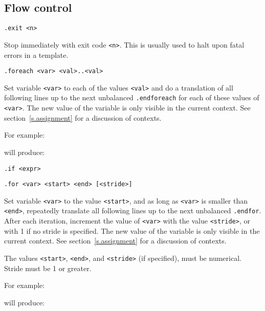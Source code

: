 \subsection{Flow control}
\begin{verbatim}
.exit <n>
\end{verbatim}
\begin{desc}
Stop {\Tm} immediately with exit code \texttt{<n>}.
This is usually used to halt upon fatal errors in a template.
\end{desc}
\begin{verbatim}
.foreach <var> <val>..<val>
\end{verbatim}
\begin{desc}
Set variable \texttt{<var>} to each of the values \texttt{<val>} and do a
translation of all following lines up to the next unbalanced
\texttt{.endforeach} for each of these values of \texttt{<var>}.
The new value of the variable is only visible in the current context.
See section~\ref{s.assignment} for a discussion of contexts.

For example:
\begin{showfile}

\end{showfile}
will produce:
\begin{showfile}

\end{showfile}
\end{desc}
\begin{verbatim}
.if <expr>
\end{verbatim}
\begin{verbatim}
.for <var> <start> <end> [<stride>]
\end{verbatim}
\begin{desc}
Set variable \texttt{<var>} to the value \texttt{<start>},
and as long as \texttt{<var>} is smaller than \texttt{<end>},
repeatedly translate all
following lines up to the next unbalanced
\texttt{.endfor}.
After each iteration, increment the value of
\texttt{<var>} with the value 
\texttt{<stride>}, or with 1 if no stride is specified.
The new value of the variable is only visible in the current context.
See section~\ref{s.assignment} for a discussion of contexts.

The values 
\texttt{<start>},
\texttt{<end>},
and \texttt{<stride>} (if specified), must be numerical.
Stride must be 1 or greater.

For example:
\begin{showfile}

\end{showfile}
will produce:
\begin{showfile}

\end{showfile}
\end{desc}
